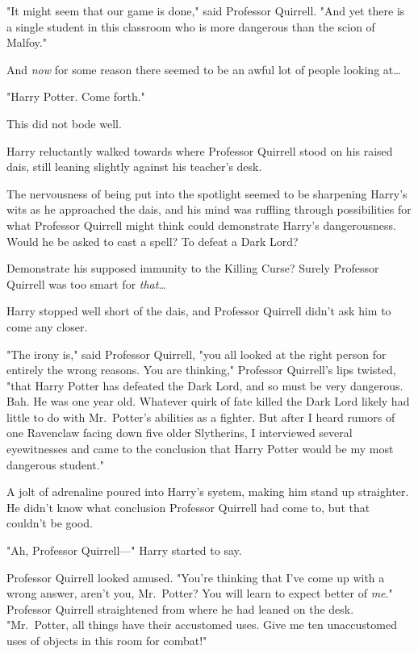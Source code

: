 "It might seem that our game is done," said Professor Quirrell. "And yet there 
is a single student in this classroom who is more dangerous than the scion of 
Malfoy."

And \emph{now} for some reason there seemed to be an awful lot of people 
looking at{\ldots}

"Harry Potter. Come forth."

This did not bode well.

Harry reluctantly walked towards where Professor Quirrell stood on his raised 
dais, still leaning slightly against his teacher's desk.

The nervousness of being put into the spotlight seemed to be sharpening Harry's 
wits as he approached the dais, and his mind was ruffling through possibilities 
for what Professor Quirrell might think could demonstrate Harry's 
dangerousness. Would he be asked to cast a spell? To defeat a Dark Lord?

Demonstrate his supposed immunity to the Killing Curse? Surely Professor 
Quirrell was too smart for \emph{that}{\ldots}

Harry stopped well short of the dais, and Professor Quirrell didn't ask him to 
come any closer.

"The irony is," said Professor Quirrell, "you all looked at the right person 
for entirely the wrong reasons. You are thinking," Professor Quirrell's lips 
twisted, "that Harry Potter has defeated the Dark Lord, and so must be very 
dangerous. Bah. He was one year old. Whatever quirk of fate killed the Dark 
Lord likely had little to do with Mr.~Potter's abilities as a fighter. But 
after I heard rumors of one Ravenclaw facing down five older Slytherins, I 
interviewed several eyewitnesses and came to the conclusion that Harry Potter 
would be my most dangerous student."

A jolt of adrenaline poured into Harry's system, making him stand up 
straighter. He didn't know what conclusion Professor Quirrell had come to, but 
that couldn't be good.

"Ah, Professor Quirrell---" Harry started to say.

Professor Quirrell looked amused. "You're thinking that I've come up with a 
wrong answer, aren't you, Mr.~Potter? You will learn to expect better of 
\emph{me}." Professor Quirrell straightened from where he had leaned on the 
desk. "Mr.~Potter, all things have their accustomed uses. Give me ten 
unaccustomed uses of objects in this room for combat!"

